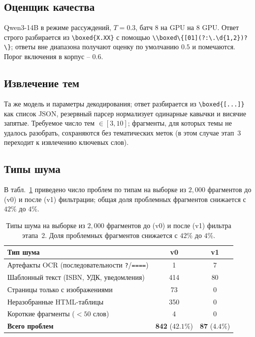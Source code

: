 \documentclass{article}
\begin{document}
\subsection{Оценщик качества}
Qwen3-14B в режиме рассуждений, $T=0.3$, батч $8$ на GPU на $8$ GPU. Ответ строго разбирается из \verb|\boxed{X.XX}| с помощью \verb|\\boxed\{[01](?:\.\d{1,2})?\}|; ответы вне диапазона получают оценку по умолчанию $0.5$ и помечаются. Порог включения в корпус -- $0.6$.

\subsection{Извлечение тем}
Та же модель и параметры декодирования; ответ разбирается из \verb|\boxed{[...]}| как список JSON, резервный парсер нормализует одинарные кавычки и висячие запятые. Требуемое число тем $\in [3, 10]$; фрагменты, для которых темы не удалось разобрать, сохраняются без тематических меток (в этом случае этап~3 переходит к извлечению ключевых слов).

\subsection{Типы шума}\label{app:noise}

В табл.~\ref{tab:noise-types} приведено число проблем по типам на выборке из $2{,}000$ фрагментов до (v0) и после (v1) фильтрации; общая доля проблемных фрагментов снижается с $42\%$ до $4\%$.

\begin{table}[h]
  \centering
  \caption{Типы шума на выборке из $2{,}000$ фрагментов до (v0) и после (v1) фильтра этапа~2. Доля проблемных фрагментов снижается с $42\%$ до $4\%$.}
  \label{tab:noise-types}
  \begin{tabular}{lcc}
    \toprule
    Тип шума & v0 & v1 \\
    \midrule
    Артефакты OCR (последовательности \texttt{?}/\texttt{====})  & 1   & 7  \\
    Шаблонный текст (ISBN, УДК, уведомления)        & 414 & 80 \\
    Страницы только с изображениями                 & 73  & 0  \\
    Неразобранные HTML-таблицы                      & 350 & 0  \\
    Короткие фрагменты ($<50$ слов)                 & 4   & 0  \\
    \midrule
    \textbf{Всего проблем}
      & \textbf{842} ($42.1\%$) & \textbf{87} ($4.4\%$) \\
    \bottomrule
  \end{tabular}
\end{table}
\end{document}
